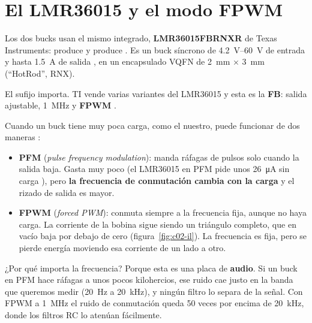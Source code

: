 \section{El LMR36015 y el modo FPWM}\label{sec:c02-fpwm}

Los dos bucks usan el mismo integrado, \textbf{LMR36015FBRNXR} de Texas Instruments:  produce  y  produce . Es un buck síncrono de \SIrange{4.2}{60}{\volt} de entrada y hasta \SI{1.5}{\ampere} de salida , en un encapsulado VQFN de \SI{2}{\milli\meter} $\times$ \SI{3}{\milli\meter} (``HotRod'', RNX).

El sufijo importa. TI vende varias variantes del LMR36015 y esta es la \textbf{FB}: salida ajustable, \SI{1}{\mega\hertz} y \textbf{FPWM} .

\begin{idea}
Cuando un buck tiene muy poca carga, como el nuestro, puede funcionar de dos maneras :
\begin{itemize}
  \item \textbf{PFM} (\emph{pulse frequency modulation}): manda ráfagas de pulsos solo cuando la salida baja. Gasta muy poco (el LMR36015 en PFM pide unos \SI{26}{\micro\ampere} sin carga ), pero \textbf{la frecuencia de conmutación cambia con la carga} y el rizado de salida es mayor.
  \item \textbf{FPWM} (\emph{forced PWM}): conmuta siempre a la frecuencia fija, aunque no haya carga. La corriente de la bobina sigue siendo un triángulo completo, que en vacío baja por debajo de cero (figura~\ref{fig:c02-il}). La frecuencia es fija, pero se pierde energía moviendo esa corriente de un lado a otro.
\end{itemize}
\end{idea}

¿Por qué importa la frecuencia? Porque esta es una placa de \textbf{audio}. Si un buck en PFM hace ráfagas a unos pocos kilohercios, ese ruido cae justo en la banda que queremos medir (\SI{20}{\hertz} a \SI{20}{\kilo\hertz}), y ningún filtro lo separa de la señal. Con FPWM a \SI{1}{\mega\hertz} el ruido de conmutación queda 50 veces por encima de \SI{20}{\kilo\hertz}, donde los filtros RC lo atenúan fácilmente.

